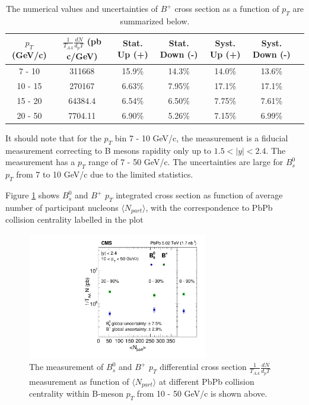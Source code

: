 \begin{table}[h]
\begin{center}
\caption{The numerical values and uncertainties of $B^+$ cross section as a function of $p_T$ are summarized below.}
\vspace{1em}
\label{BPXsectPt}
  \begin{tabular}{| c | c |c | c| c| c| c|}
    \hline
$p_T$ (GeV/c) &  $\frac{1}{T_{AA}} \frac{dN}{d_pT}$ (pb c/GeV) & Stat. Up (+)   & Stat. Down (-)  &  Syst. Up (+)  &  Syst. Down (-) \\
    \hline
    \hline
 7 - 10 &   311668  &  15.9\% & 14.3\% & 14.0\% & 13.6\% \\ 
 10 - 15 & 270167  & 6.63\%  & 7.95\%  & 17.1\% & 17.1\% \\ 
 15 - 20 &  64384.4 & 6.54\%   &  6.50\% & 7.75\% & 7.61\% \\ 
 20 - 50 &  7704.11    & 6.90\%  &  5.26\% & 7.15\% &6.99\% \\ 
    \hline
    \hline
\end{tabular}
\end{center}
\end{table}

It should note that for the $p_T$ bin 7 - 10 GeV/c, the measurement is a fiducial measurement correcting to B mesons rapidity only up to $1.5 < |y| < 2.4$. The measurement has a $p_T$ range of 7 - 50 GeV/c. The uncertainties are large for $B^0_s$ $p_T$ from 7 to 10 GeV/c due to the limited statistics. 



Figure \ref{BmesonDataCent} shows $B^0_s$ and $B^+$ $p_T$ integrated cross section as function of average number of participant nucleons $\langle N_{part}\rangle$, with the correspondence to PbPb collision centrality labelled in the plot
 

\begin{figure}[hbtp]
\begin{center}
\includegraphics[width=0.70\textwidth]{Figures/Chapter5/xsec_vsCent.pdf}
\caption{The measurement of $B^0_s$ and $B^+$ $p_T$ differential cross section $\frac{1}{T_{AA}} \frac{dN}{d_pT}$ measurement as function of $\langle N_{part}\rangle$ at different PbPb collision centrality within B-meson $p_T$ from 10 - 50 GeV/c is shown above. }
\label{BmesonDataCent}
\end{center}
\end{figure}

